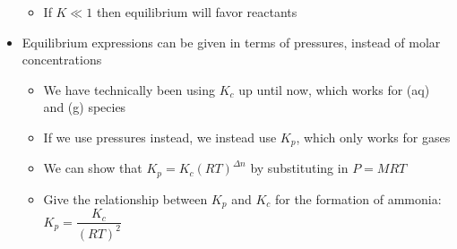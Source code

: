 \documentclass[12pt, openany, letterpaper]{memoir}
\begin{document}
\begin{itemize}
\begin{itemize}
		\item If $K \ll 1$ then equilibrium will favor reactants
	\end{itemize}
	\item Equilibrium expressions can be given in terms of pressures, instead of molar concentrations
	\begin{itemize}
		\item We have technically been using $K_c$ up until now, which works for (aq) and (g) species
		\item If we use pressures instead, we instead use $K_p$, which only works for gases
		\item We can show that $K_p = K_c\left(RT\right)^{\Delta n}$ by substituting in $P=MRT$
		\item Give the relationship between $K_p$ and $K_c$ for the formation of ammonia: $K_p = \dfrac{K_c}{\left(RT\right)^2}$
	\end{itemize}
\end{itemize}
\end{document}
